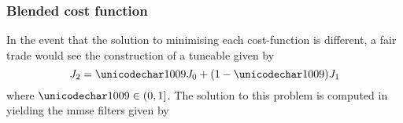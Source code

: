 \subsubsection{Blended cost function}
In the event that the solution to minimising each cost-function is different, a fair trade would see the construction of a tuneable  given by
\begin{equation}
 \costFunction{2} = \cost\costFunction{0} + (1-\cost)\costFunction{1}
\end{equation}
where $\cost\in(0,1]$.
The solution to this problem is computed in \cite{NovelRadar} yielding the \gls{mmse} filters given by
\begin{center}
\end{center}


